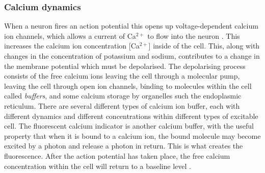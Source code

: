\documentclass[a4paper,12pt]{article}
\theoremstyle{definition}
\begin{document}
\subsubsection{Calcium dynamics}
	When a neuron fires an action potential this opens up voltage-dependent calcium ion channels, which allows a current of Ca$^{2+}$ to flow into the neuron \cite{koch}. This increases the calcium ion concentration [Ca$^{2+}$] inside of the cell. This, along with changes in the concentration of potassium and sodium, contributes to a change in the membrane potential which must be depolarised. The depolarising process consists of the free calcium ions leaving the cell through a molecular pump, leaving the cell through open ion channels, binding to molecules within the cell called \textit{buffers}, and some calcium storage by organelles such the endoplasmic reticulum. There are several different types of calcium ion buffer, each with different dynamics and different concentrations within different types of excitable cell. The fluorescent calcium indicator is another calcium buffer, with the useful property that when it is bound to a calcium ion, the bound molecule may become excited by a photon and release a photon in return. This is what creates the fluorescence. After the action potential has taken place, the free calcium concentration within the cell will return to a baseline level \cite{maravall}.
\end{document}
